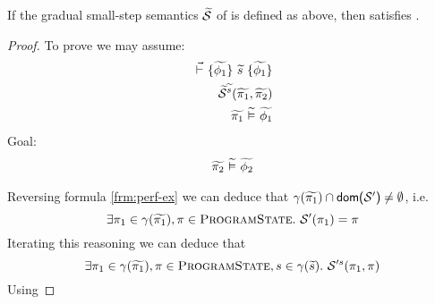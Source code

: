 \begin{theorem}[]
    If the gradual small-step semantics $\widetilde{\mathcal{S}}$ of \gvl is defined as above, then \gvl satisfies .
\end{theorem}
\begin{proof}
    To prove  we may assume:
    \begin{align*}
    {} \,\,\vec{\vdash}\,\, \{{\widetilde{\phi_1}}\} ~{\widetilde{s}}~ \{{\widetilde{\phi_1}}\}\\
    \widetilde{\mathcal{S}}^{\widetilde{s}}(\widetilde{\pi_1}, \widetilde{\pi_2})\\
    \widetilde{\pi_1} \,\,\widetilde{\vDash}\,\, \widetilde{\phi_1}
    \end{align*}
    Goal: 
    \begin{align*}
    \widetilde{\pi_2} \,\,\widetilde{\vDash}\,\, \widetilde{\phi_2}
    \end{align*}
    
    Reversing formula \ref{frm:perf-ex} we can deduce that $\gamma(\widetilde{\pi_1}) \cap \textup{\textmd{\textsf{dom($\mathcal{S}'$)}}} \neq \emptyset$, i.e.
    \begin{displaymath}
    \exists \pi_1 \in \gamma(\widetilde{\pi_1}), \pi \in \textup{\textsc{ProgramState}}.~ \mathcal{S}'(\pi_1) = \pi
    \end{displaymath}
    Iterating this reasoning we can deduce that
    \begin{displaymath}
    \exists \pi_1 \in \gamma(\widetilde{\pi_1}), \pi \in \textup{\textsc{ProgramState}}, s \in \gamma(\widetilde{s}).~ \mathcal{S}'^s(\pi_1, \pi)
    \end{displaymath}
    Using 
\end{proof}
 
